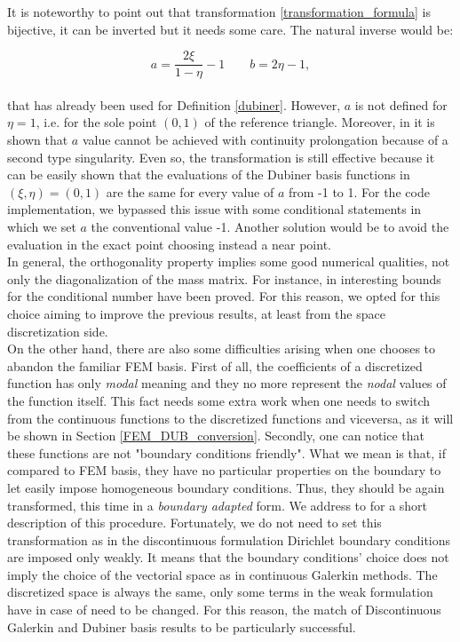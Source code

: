 \documentclass[a4paper,11pt]{article}
\begin{document}
    \noindent It is noteworthy to point out that transformation \ref{transformation_formula} is bijective, it can be inverted but it needs some care. The natural inverse would be:
    
    \begin{equation*}
    a = \frac{2\xi}{1-\eta}-1 \quad \quad b = 2\eta-1,
    \end{equation*}
    \vspace{2mm} \\
    \noindent that has already been used for Definition \ref{dubiner}. However, $a$ is not defined for $\eta=1$, i.e. for the sole point $(0,1)$ of the reference triangle. Moreover, in \cite{sherwin} it is shown that $a$ value cannot be achieved with continuity prolongation because of a second type singularity. Even so, the transformation is still effective because it can be easily shown that the evaluations of the Dubiner basis functions in $(\xi,\eta)=(0,1)$ are the same for every value of $a$ from -1 to 1. For the code implementation, we bypassed this issue with some conditional statements in which we set $a$ the conventional value -1. Another solution would be to avoid the evaluation in the exact point choosing instead a near point.\\
    
    \noindent In general, the orthogonality property implies some good numerical qualities, not only the diagonalization of the mass matrix. For instance, in \cite{antonietti} interesting bounds for the conditional number have been proved. For this reason, we opted for this choice aiming to improve the previous results, at least from the space discretization side. \\
    
    \noindent On the other hand, there are also some difficulties arising when one chooses to abandon the familiar FEM basis. First of all, the coefficients of a discretized function has only \emph{modal} meaning and they no more represent the \emph{nodal} values of the function itself. This fact needs some extra work when one needs to switch from the continuous functions to the discretized functions and viceversa, as it will be shown in Section \ref{FEM_DUB_conversion}. Secondly, one can notice that these functions are not "boundary conditions friendly". What we mean is that, if compared to FEM basis, they have no particular properties on the boundary to let easily impose homogeneous boundary conditions. Thus, they should be again transformed, this time in a \emph{boundary adapted} form. We address to \cite{napde} for a short description of this procedure. Fortunately, we do not need to set this transformation as in the discontinuous formulation Dirichlet boundary conditions are imposed only weakly. It means that the boundary conditions' choice does not imply the choice of the vectorial space as in continuous Galerkin methods. The discretized space is always the same, only some terms in the weak formulation have in case of need to be changed. For this reason, the match of Discontinuous Galerkin and Dubiner basis results to be particularly successful. \\
    
\end{document}
